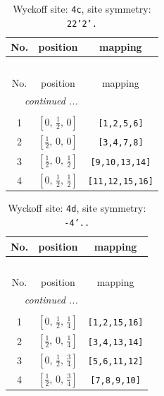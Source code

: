 \documentclass[fleqn,8pt]{jsarticle}
\begin{document}
\renewcommand{\arraystretch}{1.2}
\begin{longtable}{ccc}
\caption{Wyckoff site: {\tt 4c}, site symmetry: {\tt 22'2'.}}
 \\
 \hline \hline
No. & position & mapping \\ \hline \endfirsthead

\multicolumn{2}{l}{\tablename\ \thetable{}} \\
 \hline \hline
No. & position & mapping \\ \hline \endhead

 \hline \hline
\multicolumn{2}{r}{\footnotesize\it continued ...} \\ \endfoot

 \hline \hline
\multicolumn{2}{r}{} \\ \endlastfoot

1 & $\left[ 0,\, \frac{1}{2},\, 0 \right]$ & {\tt [1,2,5,6]} \\ \hline
2 & $\left[ \frac{1}{2},\, 0,\, 0 \right]$ & {\tt [3,4,7,8]} \\ \hline
3 & $\left[ \frac{1}{2},\, 0,\, \frac{1}{2} \right]$ & {\tt [9,10,13,14]} \\ \hline
4 & $\left[ 0,\, \frac{1}{2},\, \frac{1}{2} \right]$ & {\tt [11,12,15,16]} \\
\end{longtable}
\renewcommand{\arraystretch}{1.2}
\begin{longtable}{ccc}
\caption{Wyckoff site: {\tt 4d}, site symmetry: {\tt -4'..}}
 \\
 \hline \hline
No. & position & mapping \\ \hline \endfirsthead

\multicolumn{2}{l}{\tablename\ \thetable{}} \\
 \hline \hline
No. & position & mapping \\ \hline \endhead

 \hline \hline
\multicolumn{2}{r}{\footnotesize\it continued ...} \\ \endfoot

 \hline \hline
\multicolumn{2}{r}{} \\ \endlastfoot

1 & $\left[ 0,\, \frac{1}{2},\, \frac{1}{4} \right]$ & {\tt [1,2,15,16]} \\ \hline
2 & $\left[ \frac{1}{2},\, 0,\, \frac{1}{4} \right]$ & {\tt [3,4,13,14]} \\ \hline
3 & $\left[ 0,\, \frac{1}{2},\, \frac{3}{4} \right]$ & {\tt [5,6,11,12]} \\ \hline
4 & $\left[ \frac{1}{2},\, 0,\, \frac{3}{4} \right]$ & {\tt [7,8,9,10]} \\
\end{longtable}
\end{document}
